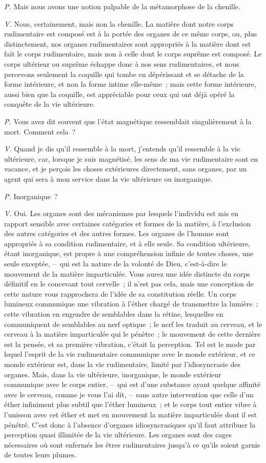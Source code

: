 \documentclass[french,twoside]{book} %
\begin{document}
\emph{P.} Mais nous avons une notion palpable de la métamorphose de la chenille.\par
\emph{V.} Nous, certainement, mais non la chenille. La matière dont notre corps rudimentaire est composé est à la portée des organes de ce même corps, ou, plus distinctement, nos organes rudimentaires sont appropriés à la matière dont est fait le corps rudimentaire, mais non à celle dont le corps suprême est composé. Le corps ultérieur ou suprême échappe donc à nos sens rudimentaires, et nous percevons seulement la coquille qui tombe en dépérissant et se détache de la forme intérieure, et non la forme intime elle-même ; mais cette forme intérieure, aussi bien que la coquille, est appréciable pour ceux qui ont déjà opéré la conquête de la vie ultérieure.\par
\emph{P.} Vous avez dit souvent que l’état magnétique ressemblait singulièrement à la mort. Comment cela ?\par
\emph{V.} Quand je dis qu’il ressemble à la mort, j’entends qu’il ressemble à la vie ultérieure, car, lorsque je suis magnétisé, les sens de ma vie rudimentaire sont en vacance, et je perçois les choses extérieures directement, sans organes, par un agent qui sera à mon service dans la vie ultérieure ou inorganique.\par
\emph{P.} Inorganique ?\par
\emph{V.} Oui. Les organes sont des mécanismes par lesquels l’individu est mis en rapport sensible avec certaines catégories et formes de la matière, à l’exclusion des autres catégories et des autres formes. Les organes de l’homme sont appropriés à sa condition rudimentaire, et à elle seule. Sa condition ultérieure, étant inorganique, est propre à une compréhension infinie de toutes choses, une seule exceptée, – qui est la nature de la volonté de Dieu, c’est-à-dire le mouvement de la matière imparticulée. Vous aurez une idée distincte du corps définitif en le concevant tout cervelle ; il n’est pas cela, mais une conception de cette nature vous rapprochera de l’idée de sa constitution réelle. Un corps lumineux communique une vibration à l’éther chargé de transmettre la lumière ; cette vibration en engendre de semblables dans la rétine, lesquelles en communiquent de semblables au nerf optique ; le nerf les traduit au cerveau, et le cerveau à la matière imparticulée qui le pénètre ; le mouvement de cette dernière est la pensée, et sa première vibration, c’était la perception. Tel est le mode par lequel l’esprit de la vie rudimentaire communique avec le monde extérieur, et ce monde extérieur est, dans la vie rudimentaire, limité par l’idiosyncrasie des organes. Mais, dans la vie ultérieure, inorganique, le monde extérieur communique avec le corps entier, – qui est d’une substance ayant quelque affinité avec le cerveau, comme je vous l’ai dit, – sans autre intervention que celle d’un éther infiniment plus subtil que l’éther lumineux ; et le corps tout entier vibre à l’unisson avec cet éther et met en mouvement la matière imparticulée dont il est pénétré. C’est donc à l’absence d’organes idiosyncrasiques qu’il faut attribuer la perception quasi illimitée de la vie ultérieure. Les organes sont des cages nécessaires où sont enfermés les êtres rudimentaires jusqu’à ce qu’ils soient garnis de toutes leurs plumes.\par
\end{document}

